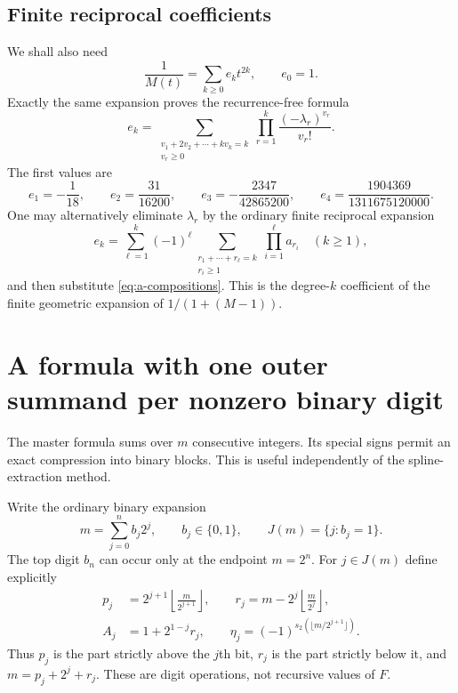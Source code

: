 \documentclass[11pt,a4paper]{article}
\numberwithin{equation}{section}
\theoremstyle{definition}
\theoremstyle{remark}
\newcommand{\floor}[1]{\left\lfloor #1\right\rfloor}
\newcommand{\bits}{s_2}
\begin{document}
\subsection{Finite reciprocal coefficients}
We shall also need
\begin{equation}
 \frac1{M(t)}=\sum_{k\ge0}e_kt^{2k},\qquad e_0=1.
 \label{eq:inverse-M}
\end{equation}
Exactly the same expansion proves the recurrence-free formula
\begin{equation}
 e_k=\sum_{\substack{v_1+2v_2+\cdots+kv_k=k\\v_r\ge0}}
        \prod_{r=1}^{k}\frac{(-\lambda_r)^{v_r}}{v_r!}.
 \label{eq:e-partitions}
\end{equation}
The first values are
\begin{equation}
 e_1=-\frac1{18},\qquad
 e_2=\frac{31}{16200},\qquad
 e_3=-\frac{2347}{42865200},\qquad
 e_4=\frac{1904369}{1311675120000}.
 \label{eq:e-small}
\end{equation}
One may alternatively eliminate $\lambda_r$ by the ordinary finite reciprocal expansion
\begin{equation}
 e_k=\sum_{\ell=1}^{k}(-1)^\ell
      \sum_{\substack{r_1+\cdots+r_\ell=k\\r_i\ge1}}
      \prod_{i=1}^{\ell}a_{r_i}\quad(k\ge1),
 \label{eq:e-compositions}
\end{equation}
and then substitute \cref{eq:a-compositions}. This is the degree-$k$ coefficient of the finite geometric expansion of $1/(1+(M-1))$.

\section{A formula with one outer summand per nonzero binary digit}
\label{sec:binary}

The master formula sums over $m$ consecutive integers. Its special signs permit an exact compression into binary blocks. This is useful independently of the spline-extraction method.

Write the ordinary binary expansion
\begin{equation}
 m=\sum_{j=0}^{n}b_j2^j,\qquad b_j\in\{0,1\},\qquad
 J(m)=\{j:b_j=1\}.
 \label{eq:binary-data}
\end{equation}
The top digit $b_n$ can occur only at the endpoint $m=2^n$. For $j\in J(m)$ define explicitly
\begin{equation}
 \begin{split}
 p_j&=2^{j+1}\floor{\frac{m}{2^{j+1}}},\qquad
 r_j=m-2^j\floor{\frac{m}{2^j}},\\
 A_j&=1+2^{1-j}r_j,\qquad
 \eta_j=(-1)^{\bits(\lfloor m/2^{j+1}\rfloor)}.
 \end{split}
 \label{eq:binary-parameters}
\end{equation}
Thus $p_j$ is the part strictly above the $j$th bit, $r_j$ is the part strictly below it, and $m=p_j+2^j+r_j$. These are digit operations, not recursive values of $F$.
\end{document}
